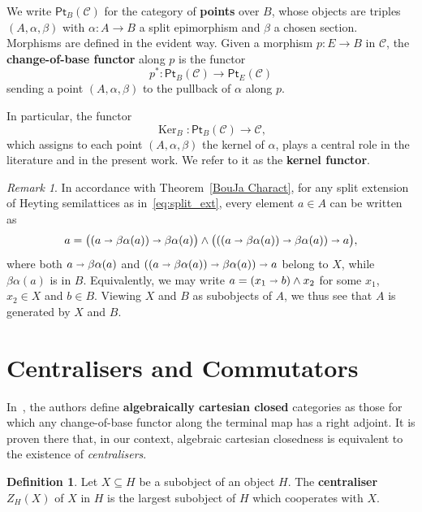 \documentclass[reqno,a4paper]{amsart}
\theoremstyle{remark}
\newtheorem{remark}[lemma]{Remark}
\theoremstyle{definition}
\newtheorem{definition}[lemma]{Definition}
\newcommand{\defn}{\textbf}
\newcommand{\oleq}{\subseteq} %
\newcommand{\iimplies}{\shortrightarrow}
\DeclareMathOperator{\Ker}{Ker}
\newcommand{\C}{\ensuremath{\mathcal{C}}}
\newcommand{\Pt}{\ensuremath{\mathsf{Pt}}}
\begin{document}
We write \(\Pt_B(\C)\) for the category of \defn{points} over \(B\), whose objects are triples \((A,\alpha,\beta)\) with \(\alpha\colon A \to B\) a split epimorphism and \(\beta\) a chosen section. Morphisms are defined in the evident way.
Given a morphism \(p\colon E \to B\) in \(\C\), the \defn{change-of-base functor} along \(p\) is the functor
\[
	p^* \colon \Pt_B(\C) \longrightarrow \Pt_E(\C)
\]
sending a point \((A,\alpha,\beta)\) to the pullback of \(\alpha\) along \(p\).

In particular, the functor
\[
	\Ker_B \colon \Pt_B(\C) \longrightarrow \C,
\]
which assigns to each point \((A,\alpha,\beta)\) the kernel of \(\alpha\), plays a central role in the literature and in the present work.
We refer to it as the \defn{kernel functor}.


\begin{remark}\label{Remark Split Extension}
	In accordance with Theorem~\ref{BouJa Charact}, for any split extension of Heyting semilattices as in~\eqref{eq:split_ext}, every element \(a \in A\) can be written as
	\[
		a
		= \bigl( (a \iimplies \beta\alpha(a)) \iimplies \beta\alpha(a) \bigr)
		\wedge
		\bigl( ((a \iimplies \beta\alpha(a)) \iimplies \beta\alpha(a)) \iimplies a \bigr),
	\]
	where both
	\(
	a \iimplies \beta\alpha(a)
	\)
	and
	\(
	((a \iimplies \beta\alpha(a)) \iimplies \beta\alpha(a)) \iimplies a
	\)
	belong to \(X\), while \(\beta\alpha(a)\) is in \(B\).
	Equivalently, we may write \(a = (x_1 \iimplies b) \wedge x_2\) for some \(x_1\), \(x_2 \in X\) and \(b \in B\).
	Viewing \(X\) and \(B\) as subobjects of \(A\), we thus see that \(A\) is generated by \(X\) and \(B\).
\end{remark}


\section{Centralisers and Commutators}\label{section acc and w}

In~\cite{Bourn-Gray}, the authors define \defn{algebraically cartesian closed} categories as those for which any change-of-base functor along the terminal map has a right adjoint. It is proven there that, in our context, algebraic cartesian closedness is equivalent to the existence of \emph{centralisers}.

\begin{definition}\label{Def Centraliser}
	Let \(X\oleq H\) be a subobject of an object \(H\). The \textbf{centraliser} \(Z_H(X)\) of \(X\) in \(H\) is the largest subobject of \(H\) which cooperates with \(X\).
\end{definition}
\end{document}
